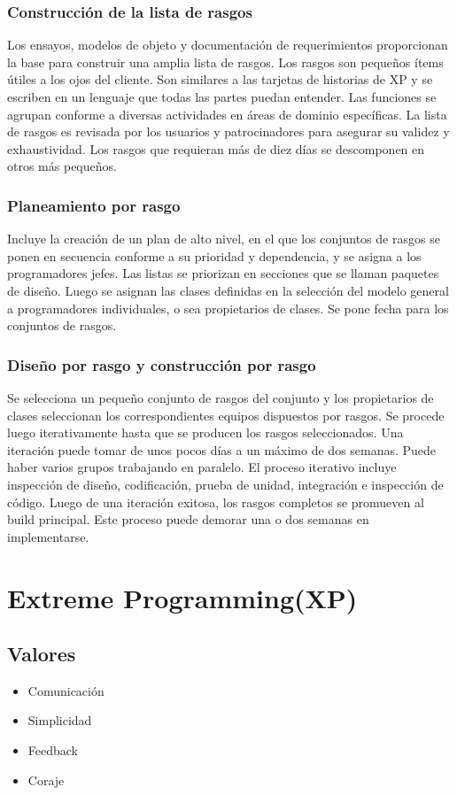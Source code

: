 \documentclass{article}
\begin{document}
\subsubsection{Construcción de la lista de rasgos}
Los ensayos, modelos de objeto y
documentación de requerimientos proporcionan la base para construir una amplia lista
de rasgos. Los rasgos son pequeños ítems útiles a los ojos del cliente. Son similares a
las tarjetas de historias de XP y se escriben en un lenguaje que todas las partes puedan
entender. Las funciones se agrupan conforme a diversas actividades en áreas de
dominio específicas. La lista de rasgos es revisada por los usuarios y patrocinadores
para asegurar su validez y exhaustividad. Los rasgos que requieran más de diez días
se descomponen en otros más pequeños.
\subsubsection{Planeamiento por rasgo}
Incluye la creación de un plan de alto nivel, en el que los
conjuntos de rasgos se ponen en secuencia conforme a su prioridad y dependencia, y
se asigna a los programadores jefes. Las listas se priorizan en secciones que se llaman
paquetes de diseño. Luego se asignan las clases definidas en la selección del modelo
general a programadores individuales, o sea propietarios de clases. Se pone fecha para
los conjuntos de rasgos.
\subsubsection{Diseño por rasgo y construcción por rasgo}
Se selecciona un pequeño conjunto de
rasgos del conjunto y los propietarios de clases seleccionan los correspondientes
equipos dispuestos por rasgos. Se procede luego iterativamente hasta que se producen
los rasgos seleccionados. Una iteración puede tomar de unos pocos días a un máximo
de dos semanas. Puede haber varios grupos trabajando en paralelo. El proceso
iterativo incluye inspección de diseño, codificación, prueba de unidad, integración e
inspección de código. Luego de una iteración exitosa, los rasgos completos se
promueven al build principal. Este proceso puede demorar una o dos semanas en
implementarse.
\section{Extreme Programming(XP)}
\subsection{Valores}
\begin{itemize}
	\item Comunicación 
	\item Simplicidad
	\item Feedback
	\item Coraje
\end{itemize}
\end{document}
